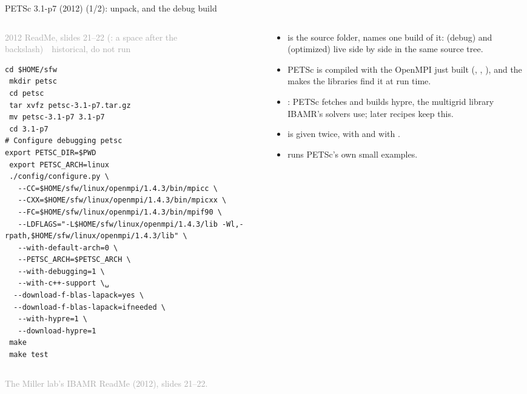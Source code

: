\documentclass[aspectratio=169,11pt]{beamer}
\newcommand{\sourcecredit}[1]{\vfill\begin{flushright}\tiny\textcolor{DarkGray}{#1}\end{flushright}}
\newcommand{\hist}[1]{{\tiny\sffamily\textcolor{DarkGray}{#1\ \textbullet\ historical, do not run}}\par\nointerlineskip\vspace{0.3mm}}
\begin{document}
\begin{frame}[fragile]{PETSc 3.1-p7 (2012) (1/2): unpack, and the debug build}
\label{fr:petsc31}
\begin{columns}[T,onlytextwidth]
\begin{column}{0.56\textwidth}
\hist{2012 ReadMe, slides 21--22 (\textvisiblespace: a space after the backslash)}
\begin{lstlisting}[style=hist]
 cd $HOME/sfw
 mkdir petsc
 cd petsc
 tar xvfz petsc-3.1-p7.tar.gz
 mv petsc-3.1-p7 3.1-p7
 cd 3.1-p7
# Configure debugging petsc
export PETSC_DIR=$PWD
 export PETSC_ARCH=linux
 ./config/configure.py \
   --CC=$HOME/sfw/linux/openmpi/1.4.3/bin/mpicc \
   --CXX=$HOME/sfw/linux/openmpi/1.4.3/bin/mpicxx \
   --FC=$HOME/sfw/linux/openmpi/1.4.3/bin/mpif90 \
   --LDFLAGS="-L$HOME/sfw/linux/openmpi/1.4.3/lib -Wl,-rpath,$HOME/sfw/linux/openmpi/1.4.3/lib" \
   --with-default-arch=0 \
   --PETSC_ARCH=$PETSC_ARCH \
   --with-debugging=1 \
   --with-c++-support \␣
  --download-f-blas-lapack=yes \
  --download-f-blas-lapack=ifneeded \
   --with-hypre=1 \
   --download-hypre=1
 make
 make test
\end{lstlisting}
\end{column}
\begin{column}{0.41\textwidth}
\scriptsize
\begin{itemize}\setlength{\itemsep}{2pt}
  \item \code{PETSC\_DIR} is the source folder,  names one build of it:  (debug) and  (optimized) live side by side in the same source tree.
  \item PETSc is compiled with the OpenMPI just built (, , ), and the  makes the libraries find it at run time.
  \item {}: PETSc fetches and builds hypre, the multigrid library IBAMR's solvers use; later recipes keep this.
  \item {} is given twice, with  and with .
  \item {} runs PETSc's own small examples.
\end{itemize}
\end{column}
\end{columns}
\sourcecredit{The Miller lab's IBAMR ReadMe (2012), slides 21--22.}
\end{frame}
\end{document}
